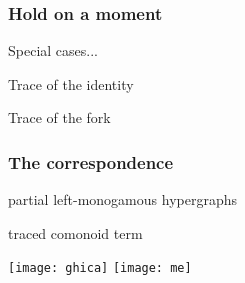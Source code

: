 \begin{frame}
    \frametitle{Hold on a moment}

    \centering

    \LARGE
    Special cases...

    \Large
    \vspace{1em}

    Trace of the identity

    \vspace{0.5em}


    \vspace{0.5em}

    Trace of the fork

    \vspace{0.5em}

\end{frame}

\begin{frame}
    \frametitle{The correspondence}

    \centering

    \begin{minipage}{0.45\textwidth}
        \begin{center}
            partial left-monogamous hypergraphs
            \vspace{1em}

        \end{center}
    \end{minipage}
    \pause
    \quad
    \raisebox{-1em}{\(\leftrightarrow\)}
    \begin{minipage}{0.45\textwidth}
        \begin{center}
            traced comonoid term

            \vspace{1em}

        \end{center}
    \end{minipage}

    \vspace{1em}

    \texttt{[image: ghica]}
    \texttt{[image: me]}

\end{frame}